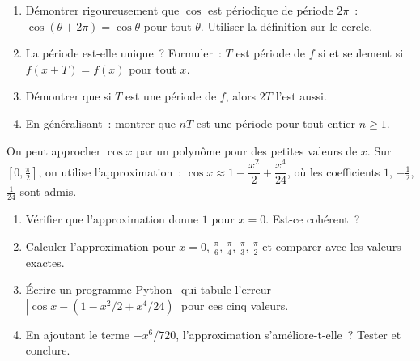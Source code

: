 \begin{bilan}
\begin{challenge}
\begin{enumerate}
  \item D\'emontrer rigoureusement que $\cos$ est p\'eriodique de p\'eriode $2\pi$~:
        $\cos(\theta+2\pi)=\cos\theta$ pour tout $\theta$.
        Utiliser la d\'efinition sur le cercle.
  \item La p\'eriode est-elle unique~? Formuler~: \og $T$ est p\'eriode de $f$
        si et seulement si $f(x+T)=f(x)$ pour tout $x$.\fg
  \item D\'emontrer que si $T$ est une p\'eriode de $f$, alors $2T$ l'est aussi.
  \item En g\'en\'eralisant~: montrer que $nT$ est une p\'eriode pour tout entier $n\geq1$.
\end{enumerate}
\end{challenge}

\begin{challenge}
On peut approcher $\cos x$ par un polyn\^ome pour des petites valeurs de $x$.
Sur $[0,\frac{\pi}{2}]$, on utilise l'approximation~:
$\cos x \approx 1 - \dfrac{x^2}{2} + \dfrac{x^4}{24}$,
o\`u les coefficients $1$, $-\frac{1}{2}$, $\frac{1}{24}$ sont admis.
\begin{enumerate}
  \item V\'erifier que l'approximation donne $1$ pour $x=0$. Est-ce coh\'erent~?
  \item Calculer l'approximation pour $x=0$, $\frac{\pi}{6}$, $\frac{\pi}{4}$, $\frac{\pi}{3}$, $\frac{\pi}{2}$
        et comparer avec les valeurs exactes.
  \item \'Ecrire un programme Python \computer\ qui tabule l'erreur
        $|\cos x - (1-x^2/2+x^4/24)|$ pour ces cinq valeurs.
  \item En ajoutant le terme $-x^6/720$, l'approximation s'am\'eliore-t-elle~?
        Tester et conclure.
\end{enumerate}
\end{challenge}

\end{bilan}


